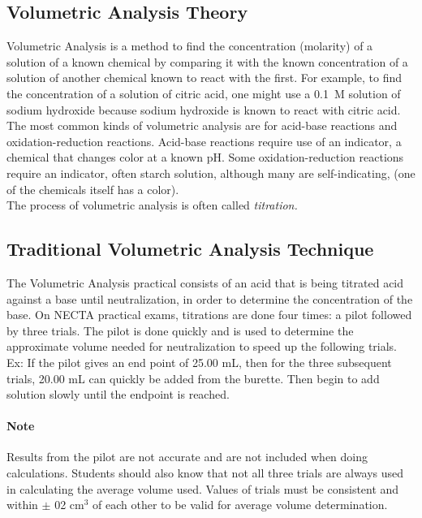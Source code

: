 \subsection{Volumetric Analysis Theory}

\noindent Volumetric Analysis is a method to find the concentration (molarity) of a solution of a known chemical by comparing it with the known concentration of a solution of another chemical known to react with the first. For example, to find the concentration of a solution of citric acid, one might use a 0.1~M solution of sodium hydroxide because sodium hydroxide is known to react with citric acid. \\

\noindent The most common kinds of volumetric analysis are for acid-base reactions and oxidation-reduction reactions. Acid-base reactions require use of an indicator, a chemical that changes color at a known pH. Some oxidation-reduction reactions require an indicator, often starch solution, although many are self-indicating, (one of the chemicals itself has a color). \\

\noindent The process of volumetric analysis is often called \textit{titration.}

\subsection{Traditional Volumetric Analysis Technique}

\noindent The Volumetric Analysis practical consists of an acid that is being titrated acid against a base until neutralization, in order to determine the concentration of the base. On NECTA practical exams, titrations are done four times: a pilot followed by three trials. The pilot is done quickly and is used to determine the approximate volume needed for neutralization to speed up the following trials.\\

\noindent Ex: If the pilot gives an end point of 25.00 mL, then for the three subsequent trials, 20.00 mL can quickly be added from the burette. Then begin to add solution slowly until the endpoint is reached.

\paragraph{Note} Results from the pilot are not accurate and are not included when doing calculations. Students should also know that not all three trials are always used in calculating the average volume used. Values of trials must be consistent and within $\pm$ 02 cm$^3$ of each other to be valid for average volume determination.

